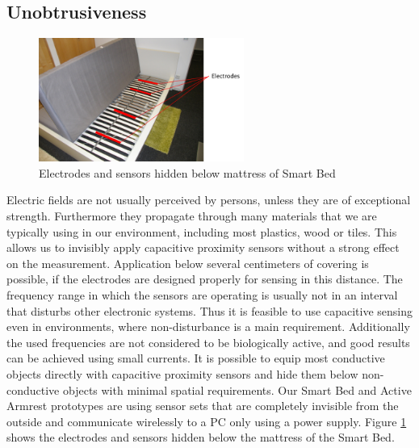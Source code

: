 \subsection{Unobtrusiveness}
 \begin{figure}[h]
\centering
\includegraphics[width=0.6\textwidth]{images/disc_unob_bed.png}
\caption{Electrodes and sensors hidden below mattress of Smart Bed}
\label{fig:disc_unob_elec}
\end{figure}
Electric fields are not usually perceived by persons, unless they are of exceptional strength. Furthermore they propagate through many materials that we are typically using in our environment, including most plastics, wood or tiles. This allows us to invisibly apply capacitive proximity sensors without a strong effect on the measurement. Application below several centimeters of covering is possible, if the electrodes are designed properly for sensing in this distance.
The frequency range in which the sensors are operating is usually not in an interval that disturbs other electronic systems. Thus it is feasible to use capacitive sensing even in environments, where non-disturbance is a main requirement.  Additionally the used frequencies are not considered to be biologically active, and good results can be achieved using small currents. 
It is possible to equip most conductive objects directly with capacitive proximity sensors and hide them below non-conductive objects with minimal spatial requirements. Our Smart Bed and Active Armrest prototypes are using sensor sets that are completely invisible from the outside and communicate wirelessly to a PC only using a power supply. Figure \ref{fig:disc_unob_elec} shows the electrodes and sensors hidden below the mattress of the Smart Bed.
